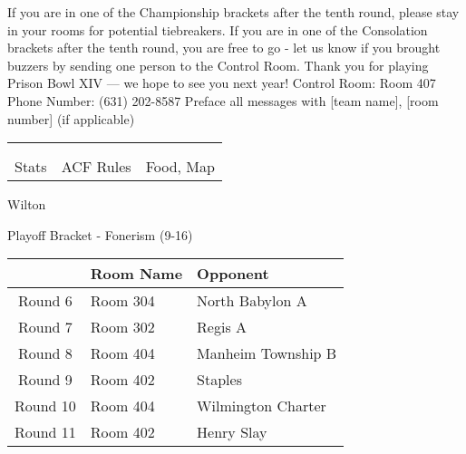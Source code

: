 \documentclass{article}%
\begin{document}
\vspace*{30pt}%
\linebreak%
If you are in one of the Championship brackets after the tenth round, please stay in your rooms for potential tiebreakers.\newline%
\newline%
If you are in one of the Consolation brackets after the tenth round, you are free to go {-} let us know if you brought buzzers by sending one person to the Control Room.\newline%
\newline%
Thank you for playing Prison Bowl XIV — we hope to see you next year!\newline%
\newline%
Control Room: Room 407\newline%
Phone Number: (631) 202{-}8587\newline%
Preface all messages with {[}team name{]}, {[}room number{]} (if applicable)%
\vspace*{30pt}%
\newline%
%
\begin{tabularx}{\textwidth}{YYY}%
  &  &  \\%
\\%
Stats&ACF Rules&Food, Map\\%
\end{tabularx}%
\newpage%
\begin{center}%
\begin{Huge}%
Wilton%
\end{Huge}%
\vspace*{12pt}%
\linebreak%
\begin{Large}%
Playoff Bracket {-} Fonerism (9{-}16)%
\end{Large}%
\end{center}%
\vspace*{4pt}%
%
\begin{tabularx}{\textwidth}{|c|Y|Y|}%
\hline%
&Room Name&Opponent\\%
\hline%
Round 6&Room 304&North Babylon A\\%
Round 7&Room 302&Regis A\\%
Round 8&Room 404&Manheim Township B\\%
Round 9&Room 402&Staples\\%
Round 10&Room 404&Wilmington Charter\\%
Round 11&Room 402&Henry Slay\\%
\hline%
\end{tabularx}%
\end{document}
